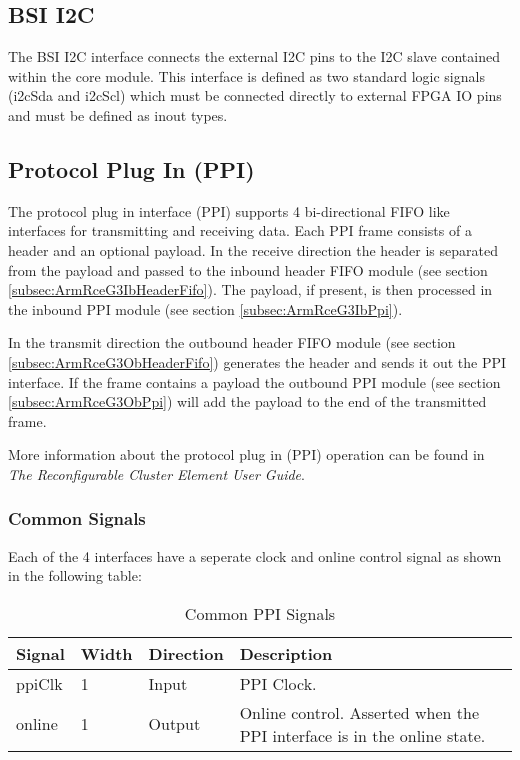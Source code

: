 \documentclass[11pt]{article}
\begin{document}
\subsection{BSI I2C}
\label{subsec:external_i2c}

The BSI I2C interface connects the external I2C pins to the I2C slave contained within the core module. This interface is defined as two
standard logic signals (i2cSda and i2cScl) which must be connected directly to external FPGA IO pins and must be defined as inout types. 

\subsection{Protocol Plug In (PPI)}
\label{subsec:external_ib_ppi}

The protocol plug in interface (PPI) supports 4 bi-directional FIFO like interfaces for transmitting and receiving data. Each PPI frame
consists of a header and an optional payload. In the receive direction the header is separated from the payload and passed to the 
inbound header FIFO module (see section \ref{subsec:ArmRceG3IbHeaderFifo}). 
The payload, if present, is then processed in the inbound PPI module (see section \ref{subsec:ArmRceG3IbPpi}). 

In the transmit direction the outbound header FIFO module (see section \ref{subsec:ArmRceG3ObHeaderFifo}) generates the header and sends it out the PPI interface. If the frame contains a payload the outbound PPI module 
(see section \ref{subsec:ArmRceG3ObPpi}) will add the payload to the end of the transmitted frame.

More information about the protocol plug in (PPI) operation can be found in \textit{The Reconfigurable Cluster Element User Guide}.

\subsubsection{Common Signals}
\label{subsubsec:external_common_ppi}

Each of the 4 interfaces have a seperate clock and online control signal as shown in the following table:

\begin{table}[H]
\small
\centering
   \begin{tabular}{| l | l | l | l |}
      \hline \textbf{Signal} & \textbf{Width} & \textbf{Direction} & \textbf{Description} \\
      \hline ppiClk & 1  & Input & PPI Clock. \\
      \hline online & 1  & Output & Online control. Asserted when the PPI interface is in the online state. \\
      \hline
   \end{tabular}
   \caption{Common PPI Signals}
\end{table}
\end{document}
